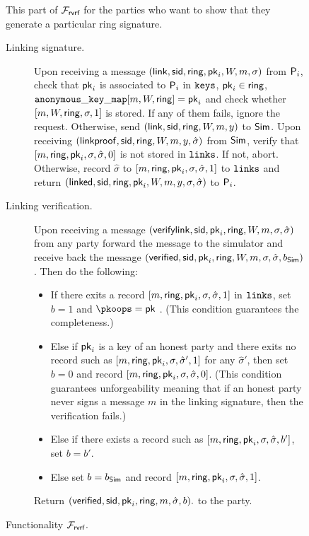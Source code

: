\begin{figure}\scriptsize
\begin{tcolorbox}
{ This part of $ \mathcal{F}_{\textsf{rvrf}} $ for the parties who want to show that they generate a particular ring signature.

\begin{description}
	\item[Linking signature.] Upon receiving a message $(\mathsf{link}, \textsf{sid}, \mathsf{ring}, \mathsf{pk}_i, W, m,\sigma)$ from $\mathsf{P}_i$, check that $\mathsf{pk}_i $ is associated to $\mathsf{P}_i$ in $ \texttt{keys} $, $ \mathsf{pk}_i \in \mathsf{ring} $, $ \mathtt{anonymous\_key\_map}[m,W, \mathsf{ring}] = \mathsf{pk}_i $ and 
	check whether $ [m, W,\mathsf{ring}, \sigma, 1] $ is stored. If any of them fails, ignore the request. Otherwise,
	send $(\mathsf{link}, \textsf{sid}, \mathsf{ring}, W, m, y)$ to $\mathsf{Sim}$. Upon receiving $(\mathsf{linkproof}, \textsf{sid}, \mathsf{ring}, W, m, y, \hat \sigma)$ from $\mathsf{Sim}$, verify that $ [m, \mathsf{ring}, \mathsf{pk}_i, \sigma, \hat{\sigma}, 0] $ is not stored in $ \texttt{links} $. If not, abort. Otherwise,  record $\hat\sigma$ to $[m, \mathsf{ring}, \mathsf{pk}_i,\sigma, \hat{\sigma}, 1]$ to $ \texttt{links} $ and return $(\mathsf{linked}, \textsf{sid}, \mathsf{ring}, \mathsf{pk}_i,W, m, y,\sigma, \hat\sigma)$ to $\mathsf{P}_i$.

	\item[Linking verification.] Upon receiving a message $(\mathsf{verifylink}, \textsf{sid}, \mathsf{pk}_i, \mathsf{ring}, W, m,\sigma,\hat\sigma)$ from any party forward the message to the simulator and receive back  the message $(\mathsf{verified}, \textsf{sid}, \mathsf{pk}_i, \mathsf{ring}, W,m, \sigma,\hat\sigma,  b_{\mathsf{Sim}})$. Then do the following:
	
	\begin{itemize}
		\item If there exits a record $ [m, \mathsf{ring},\mathsf{pk}_i,\sigma,\hat\sigma, 1] $ in $ \texttt{links} $, set $ b = 1 $ and {\color{blue} $ \pkoops = \pk $ }. (This condition guarantees the completeness.)
		\item Else if $ \mathsf{pk}_i $ is a key of an honest party and there exits no record such as $ [m, \mathsf{ring},\mathsf{pk}_i,\sigma,\hat\sigma',  1] $ for any  $  \hat\sigma'$, then set $ b = 0 $ and record $ [m, \mathsf{ring},\mathsf{pk}_i,\sigma,\hat\sigma,  0] $. (This condition guarantees unforgeability meaning that if an honest party never signs a message $ m $ in the linking signature, then the verification fails.)
		\item Else if there exists a record  such as $ [m, \mathsf{ring},\mathsf{pk}_i,\sigma,\hat\sigma,  b'] $, set $ b = b' $. 
		\item Else set $ b = b_{\mathsf{Sim}} $ and record $ [m, \mathsf{ring},\mathsf{pk}_i,\sigma,\hat\sigma,  1] $. 
	\end{itemize}
	
	Return $(\mathsf{verified}, \textsf{sid}, \mathsf{pk}_i, \mathsf{ring}, m, \hat\sigma, b).$ to the party.
\end{description}

}
\end{tcolorbox}
\caption{Functionality $\mathcal{F}_{\textsf{rvrf}}$.\label{f:gvrf2}}
\end{figure}



